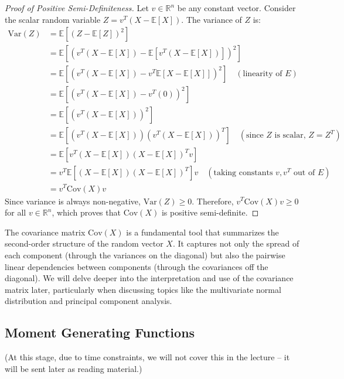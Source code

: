 \documentclass[11pt, a4paper]{article}
\theoremstyle{definition} %
\newcommand{\R}{\mathbb{R}}
\newcommand{\E}{\mathbb{E}} %
\newcommand{\Var}{\mathrm{Var}} %
\newcommand{\Cov}{\mathrm{Cov}} %
\begin{document}
\begin{proof}[Proof of Positive Semi-Definiteness]
Let $v \in \R^n$ be any constant vector. Consider the scalar random variable $Z = v^T(X - \E[X])$. The variance of $Z$ is:
\begin{align*}
\Var(Z) &= \E[(Z - \E[Z])^2] \\
&= \E[(v^T(X - \E[X]) - \E[v^T(X - \E[X])])^2] \\
&= \E[(v^T(X - \E[X]) - v^T\E[X - \E[X]])^2] \quad (\text{linearity of } E) \\
&= \E[(v^T(X - \E[X]) - v^T(0))^2] \\
&= \E[(v^T(X - \E[X]))^2] \\
&= \E[(v^T(X - \E[X])) (v^T(X - \E[X]))^T] \quad (\text{since } Z \text{ is scalar, } Z = Z^T) \\
&= \E[v^T(X - \E[X]) (X - \E[X])^T v] \\
&= v^T \E[(X - \E[X]) (X - \E[X])^T] v \quad (\text{taking constants } v, v^T \text{ out of } E) \\
&= v^T \Cov(X) v
\end{align*}
Since variance is always non-negative, $\Var(Z) \ge 0$. Therefore, $v^T \Cov(X) v \ge 0$ for all $v \in \R^n$, which proves that $\Cov(X)$ is positive semi-definite.
\end{proof}

The covariance matrix $\Cov(X)$ is a fundamental tool that summarizes the second-order structure of the random vector $X$. It captures not only the spread of each component (through the variances on the diagonal) but also the pairwise linear dependencies between components (through the covariances off the diagonal). We will delve deeper into the interpretation and use of the covariance matrix later, particularly when discussing topics like the multivariate normal distribution and principal component analysis.

\subsection{Moment Generating Functions}

(At this stage, due to time constraints, we will not cover this in the lecture – it will be sent later as reading material.)
\end{document}

